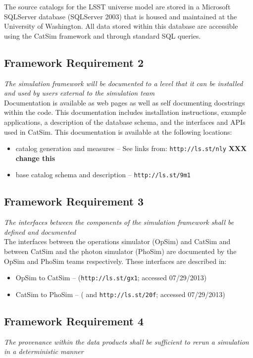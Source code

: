 \documentclass[11pt]{article}
\begin{document}
The source catalogs for the LSST universe model are stored in a
Microsoft SQLServer database (SQLServer 2003) that is housed and
maintained at the University of Washington. All data stored within
this database are accessible using the CatSim framework and through
standard SQL queries.

\subsection{Framework Requirement 2}

{\it The simulation framework will be documented to a level
  that it can be installed and used by users external to the
  simulation team}\\

Documentation is available as web pages as well as self documenting
docstrings within the code.  This documentation includes installation
instructions, example applications, a description of the database
schema, and the interfaces and APIs used in CatSim. This documentation
is available at the following locations:
\begin{itemize}
\item catalog generation and measures -- See links from: {\tt http://ls.st/nly}
{\bf XXX change this}

\item base catalog schema and description -- {\tt http://ls.st/9m1}
\end{itemize}


\subsection{Framework Requirement 3}

{\it  The interfaces between the components of the simulation framework shall be defined 
and documented}\\

The interfaces between the operations simulator (OpSim) and CatSim and
between CatSim and the photon simulator (PhoSim) are documented by the
OpSim and PhoSim teams respectively.  These interfaces are described in:
\begin{itemize}
\item OpSim to CatSim -- ({\tt http://ls.st/gx1}; accessed 07/29/2013)
\item CatSim to PhoSim -- (\citet{phosim} and {\tt http://ls.st/20f}; accessed 07/29/2013)
\end{itemize}

\subsection{Framework Requirement 4} 
\label{sec:determine}
{\it The provenance within the data products shall be sufficient to rerun a simulation in a 
deterministic manner}\\
\end{document}
